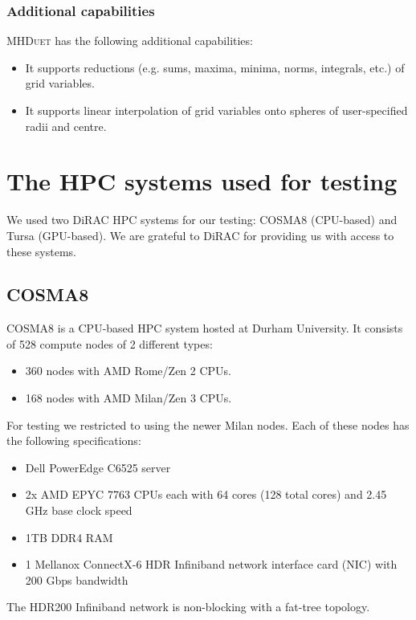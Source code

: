 \documentclass[12pt,a4paper]{article}
\numberwithin{figure}{subsection}
\newcommand{\mhduet}{\textsc{MHDuet}\xspace}
\begin{document}
\subsubsection{Additional capabilities}
\mhduet has the following additional capabilities:
\begin{itemize}
    \item It supports reductions (e.g. sums, maxima, minima, norms, integrals,
    etc.) of grid variables.
    \item It supports linear interpolation of grid variables onto spheres of
    user-specified radii and centre.
\end{itemize}

\section{The HPC systems used for testing}
\label{sec:hpc}
We used two DiRAC HPC systems for our testing: COSMA8 (CPU-based) and Tursa
(GPU-based). We are grateful to DiRAC for providing us with access to these
systems.

\subsection{COSMA8}
COSMA8 is a CPU-based HPC system hosted at Durham University. It consists of 528
compute nodes of 2 different types:
\begin{itemize}
    \item 360 nodes with AMD Rome/Zen 2 CPUs.
    \item 168 nodes with AMD Milan/Zen 3 CPUs.
\end{itemize}
For testing we restricted to using the newer Milan nodes. Each of these nodes
has the following specifications:
\begin{itemize}
    \item Dell PowerEdge C6525 server
    \item 2x AMD EPYC 7763 CPUs each with 64 cores (128 total cores) and
    2.45 GHz base clock speed
    \item 1TB DDR4 RAM
    \item 1 Mellanox ConnectX-6 HDR Infiniband network interface card (NIC) with
    200 Gbps bandwidth
\end{itemize}
The HDR200 Infiniband network is non-blocking with a fat-tree topology.
\end{document}
